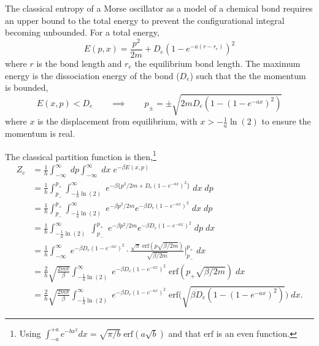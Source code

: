 \documentclass[../main.tex]{subfiles}
\begin{document}
The classical entropy of a Morse oscillator as a model of a chemical bond requires an upper bound to the total energy to prevent the configurational integral becoming unbounded. For a total energy,
\begin{equation}
	E(p, x) = \frac{p^2}{2m} + D_e (1 - e^{-a(r-r_e)})^2
\end{equation}
where $r$ is the bond length and $r_e$ the equilibrium bond length. The maximum energy is the dissociation energy of the bond ($D_e$) such that the the momentum is bounded,
\begin{equation}
	E(x, p) < D_e \qquad \implies \qquad p_\pm = \pm \sqrt{2mD_e(1 - (1-e^{-ax})^2)}
\end{equation}
where $x$ is the displacement from equilibrium, with $x > -\frac{1}{a}\ln(2)$ to ensure the momentum is real. 

The classical partition function is then,\footnote{Using $\int_{-a}^{+a}  e^{-bx^2} dx = \sqrt{\pi/b}\;\text{erf}(a\sqrt{b})$ and that $\text{erf}$ is an even function.}
\begin{equation}
	\begin{aligned}
		Z_c &= \frac{1}{h}\int_{-\infty}^\infty \; dp\int_{-\infty}^{\infty} \; dx \; e^{-\beta E(x,p)} \\
		&= \frac{1}{h}\int_{p_-}^{p_+} \int_{-\frac{1}{a}\ln(2)}^{\infty}\; e^{-\beta \{{p^2}/{2m} + D_e (1 - e^{-ax})^2\}}  \; dx  \; dp \\
		&= \frac{1}{h}\int_{p_-}^{p_+} \int_{-\frac{1}{a}\ln(2)}^{\infty}\; e^{-\beta {p^2}/{2m}} e^{-\beta D_e (1 - e^{-ax})^2}  \; dx  \; dp \\
		&= \frac{1}{h} \int_{-\frac{1}{a}\ln(2)}^{\infty}\;\int_{p_-}^{p_+}\; e^{-\beta {p^2}/{2m}} e^{-\beta D_e (1 - e^{-ax})^2}  \; dp  \; dx \\
		&= \frac{1}{h} \int_{-\infty}^{\infty}\; e^{-\beta D_e (1 - e^{-ax})^2}  \cdot \frac{\sqrt{\pi}\;\text{erf}(p\sqrt{\beta/2m})}{\sqrt{\beta/2m}} \Bigg|_{p_-}^{p_+} \; dx \\
		&= \frac{2}{h}\sqrt{\frac{2m\pi}{\beta}} \int_{-\frac{1}{a}\ln(2)}^{\infty}\; e^{-\beta D_e (1 - e^{-ax})^2}   \;\text{erf}(p_+\sqrt{\beta/2m}) \; dx \\
		&= \frac{2}{h}\sqrt{\frac{2m\pi}{\beta}} \int_{-\frac{1}{a}\ln(2)}^{\infty}\; e^{-\beta D_e (1 - e^{-ax})^2}   \;\text{erf}{\Big (} \sqrt{\beta D_e(1 - (1-e^{-ax})^2)}{\Big )} \; dx. 
	\end{aligned}
	\label{morse_pf_integral}
\end{equation}
\end{document}
